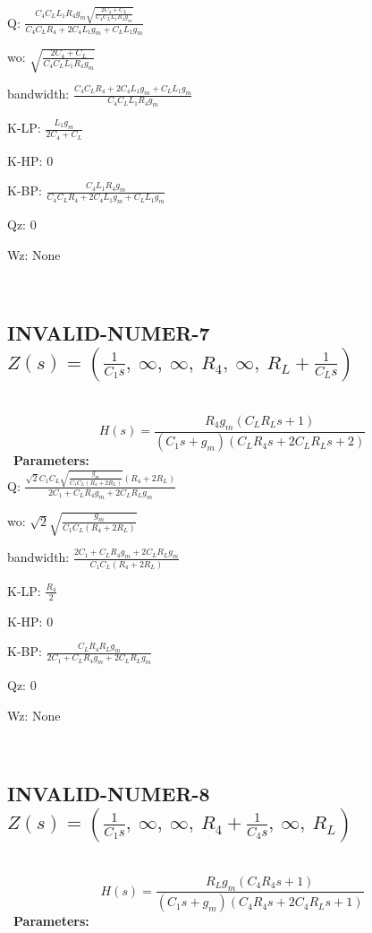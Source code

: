 \documentclass{article}
\begin{document}
Q: $\frac{C_{4} C_{L} L_{1} R_{4} g_{m} \sqrt{\frac{2 C_{4} + C_{L}}{C_{4} C_{L} L_{1} R_{4} g_{m}}}}{C_{4} C_{L} R_{4} + 2 C_{4} L_{1} g_{m} + C_{L} L_{1} g_{m}}$\ 

wo: $\sqrt{\frac{2 C_{4} + C_{L}}{C_{4} C_{L} L_{1} R_{4} g_{m}}}$\ 

bandwidth: $\frac{C_{4} C_{L} R_{4} + 2 C_{4} L_{1} g_{m} + C_{L} L_{1} g_{m}}{C_{4} C_{L} L_{1} R_{4} g_{m}}$\ 

K-LP: $\frac{L_{1} g_{m}}{2 C_{4} + C_{L}}$\ 

K-HP: $0$\ 

K-BP: $\frac{C_{4} L_{1} R_{4} g_{m}}{C_{4} C_{L} R_{4} + 2 C_{4} L_{1} g_{m} + C_{L} L_{1} g_{m}}$\ 

Qz: $0$\ 

Wz: $\text{None}$\ 

\ 

\subsection{INVALID-NUMER-7 $Z(s) = \left( \frac{1}{C_{1} s}, \  \infty, \  \infty, \  R_{4}, \  \infty, \  R_{L} + \frac{1}{C_{L} s}\right)$ } \ 
\textbf{\[H(s) = \frac{R_{4} g_{m} \left(C_{L} R_{L} s + 1\right)}{\left(C_{1} s + g_{m}\right) \left(C_{L} R_{4} s + 2 C_{L} R_{L} s + 2\right)}\] } \ 
\textbf{Parameters:}\\ 

Q: $\frac{\sqrt{2} C_{1} C_{L} \sqrt{\frac{g_{m}}{C_{1} C_{L} \left(R_{4} + 2 R_{L}\right)}} \left(R_{4} + 2 R_{L}\right)}{2 C_{1} + C_{L} R_{4} g_{m} + 2 C_{L} R_{L} g_{m}}$\ 

wo: $\sqrt{2} \sqrt{\frac{g_{m}}{C_{1} C_{L} \left(R_{4} + 2 R_{L}\right)}}$\ 

bandwidth: $\frac{2 C_{1} + C_{L} R_{4} g_{m} + 2 C_{L} R_{L} g_{m}}{C_{1} C_{L} \left(R_{4} + 2 R_{L}\right)}$\ 

K-LP: $\frac{R_{4}}{2}$\ 

K-HP: $0$\ 

K-BP: $\frac{C_{L} R_{4} R_{L} g_{m}}{2 C_{1} + C_{L} R_{4} g_{m} + 2 C_{L} R_{L} g_{m}}$\ 

Qz: $0$\ 

Wz: $\text{None}$\ 

\ 

\subsection{INVALID-NUMER-8 $Z(s) = \left( \frac{1}{C_{1} s}, \  \infty, \  \infty, \  R_{4} + \frac{1}{C_{4} s}, \  \infty, \  R_{L}\right)$ } \ 
\textbf{\[H(s) = \frac{R_{L} g_{m} \left(C_{4} R_{4} s + 1\right)}{\left(C_{1} s + g_{m}\right) \left(C_{4} R_{4} s + 2 C_{4} R_{L} s + 1\right)}\] } \ 
\textbf{Parameters:}\\ 
\end{document}
